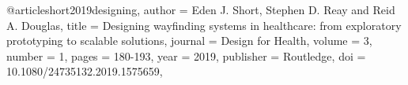@article{short2019designing,
author = {Eden J. Short, Stephen D. Reay and Reid A. Douglas},
title = {Designing wayfinding systems in healthcare: from exploratory prototyping to scalable solutions},
journal = {Design for Health},
volume = {3},
number = {1},
pages = {180-193},
year = {2019},
publisher = {Routledge},
doi = {10.1080/24735132.2019.1575659},
}
